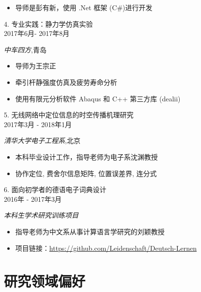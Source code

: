 \documentclass[12pt,colorlinks,linkcolor=true]{moderncv}
\begin{document}
\normalsize{\begin{itemize}
		\item 导师是彭有新，使用 .Net 框架 (C\#)进行开发
\end{itemize}}

{\raggedright\large 4. 专业实践：静力学仿真实验\\
\raggedleft\small \textsc{2017年6月- 2017年8月}\par \textit{中车四方},青岛\\[5pt]}

\normalsize{\begin{itemize}
		\item 导师为王宗正
		\item 牵引杆静强度仿真及疲劳寿命分析
		\item 使用有限元分析软件  Abaqus 和 C++ 第三方库 (dealii)
\end{itemize}}

{\raggedleft\par}

{\raggedright\large 5. 无线网络中定位信息的时空传播机理研究\\
\raggedleft\small	\textsc{2017年3月 - 2018年1月}\par \textit{清华大学电子工程系},北京 \\[5pt]}

\normalsize{\begin{itemize}
		\item 本科毕业设计工作，指导老师为电子系沈渊教授
		\item 协作定位, 费舍尔信息矩阵, 位置误差界, 连分式
\end{itemize}}

{\raggedright\large 6. 面向初学者的德语电子词典设计\\
\raggedleft\small	\textsc{2016年 - 2017年3月}\par \textit{本科生学术研究训练项目} \\[5pt]}

\normalsize{\begin{itemize}
		\item 指导老师为中文系从事计算语言学研究的刘颖教授
		\item 项目链接：\url{https://github.com/Leidenschaft/Deutsch-Lernen}
\end{itemize}}


\section{研究领域偏好}
\end{document}
